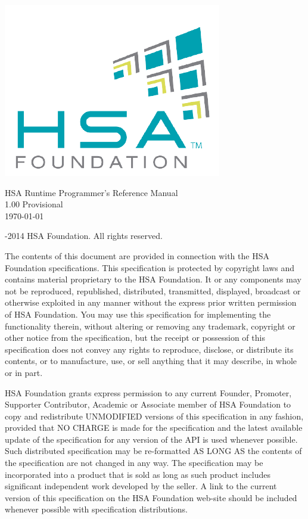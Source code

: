 \documentclass[final,oneside]{book}
\newcommand{\doctitle}{HSA Runtime Programmer's Reference Manual}
\begin{document}
\providecommand{\DIFadd}[1]{{\protect\color{Cerulean}#1}}
\renewcommand{\DIFadd}[1]{{\protect\color{Cerulean}#1}}

\begin{titlepage}
\includegraphics[width=.4\textwidth]{fig/foundation.png}
\vspace*{7cm}
\begin{center}
{\Large \doctitle\\[1ex]\large 1.00 Provisional}\\ \vspace*{1cm}
\vspace*{0.5cm}
{\small \today}
\end{center}
\end{titlepage}
\thispagestyle{empty} {-2014 HSA Foundation. All rights
  reserved.}


The contents of this document are provided in connection with the HSA Foundation
specifications. This specification is protected by copyright laws and contains
material proprietary to the HSA Foundation. It or any components may not be
reproduced, republished, distributed, transmitted, displayed, broadcast or
otherwise exploited in any manner without the express prior written permission
of HSA Foundation. You may use this specification for implementing the
functionality therein, without altering or removing any trademark, copyright or
other notice from the specification, but the receipt or possession of this
specification does not convey any rights to reproduce, disclose, or distribute
its contents, or to manufacture, use, or sell anything that it may describe, in
whole or in part.

HSA Foundation grants express permission to any current Founder, Promoter,
Supporter Contributor, Academic or Associate member of HSA Foundation to copy
and redistribute UNMODIFIED versions of this specification in any fashion,
provided that NO CHARGE is made for the specification and the latest available
update of the specification for any version of the API is used whenever
possible. Such distributed specification may be re-formatted AS LONG AS the
contents of the specification are not changed in any way. The specification may
be incorporated into a product that is sold as long as such product includes
significant independent work developed by the seller. A link to the current
version of this specification on the HSA Foundation web-site should be included
whenever possible with specification distributions.
\end{document}
